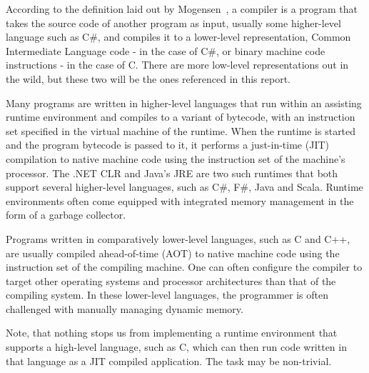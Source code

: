 \documentclass[a4paper]{article}
\begin{document}
According to the definition laid out by Mogensen~\cite{BCD}, a compiler is a program that takes the source code of another program as input, usually some higher-level language such as C\#, and compiles it to a lower-level representation, Common Intermediate Language code - in the case of C\#, or binary machine code instructions - in the case of C. There are more low-level representations out in the wild, but these two will be the ones referenced in this report.

Many programs are written in higher-level languages that run within an assisting runtime environment and compiles to a variant of bytecode, with an instruction set specified in the virtual machine of the runtime. When the runtime is started and the program bytecode is passed to it, it performs a just-in-time (JIT) compilation to native machine code using the instruction set of the machine's processor. The .NET CLR and Java's JRE are two such runtimes that both support several higher-level languages, such as C\#, F\#, Java and Scala. Runtime environments often come equipped with integrated memory management in the form of a garbage collector.

Programs written in comparatively lower-level languages, such as C and C++, are usually compiled ahead-of-time (AOT) to native machine code using the instruction set of the compiling machine. One can often configure the compiler to target other operating systems and processor architectures than that of the compiling system. In these lower-level languages, the programmer is often challenged with manually managing dynamic memory.

Note, that nothing stops us from implementing a runtime environment that supports a high-level language, such as C, which can then run code written in that language as a JIT compiled application. The task may be non-trivial.
\end{document}

